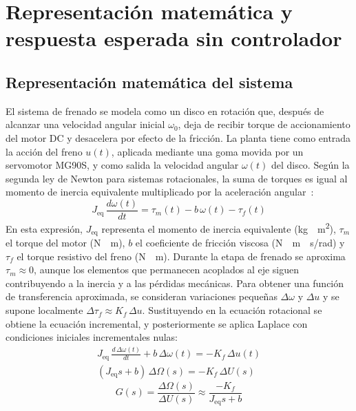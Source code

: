 \section{Representación matemática y respuesta esperada sin controlador}
\label{sec:p5}

\subsection{Representación matemática del sistema}
El sistema de frenado se modela como un disco en rotación que, después de alcanzar una velocidad
angular inicial $\omega_0$, deja de recibir torque de accionamiento del motor DC y desacelera por
efecto de la fricción. La planta tiene como entrada la acción del freno $u(t)$, aplicada mediante
una goma movida por un servomotor MG90S, y como salida la velocidad angular $\omega(t)$ del disco.
Según la segunda ley de Newton para sistemas rotacionales, la suma de torques es igual al momento
de inercia equivalente multiplicado por la aceleración angular~\cite{openstax_rotacion}:
\begin{equation}
  J_\text{eq}\,\frac{d\omega(t)}{dt} = \tau_m(t) - b\,\omega(t) - \tau_f(t)
  \label{eq:newton_rot}
\end{equation}
En esta expresión, $J_\text{eq}$ representa el momento de inercia equivalente
(\si{kg\cdot m^2}), $\tau_m$ el torque del motor (\si{N\cdot m}), $b$ el coeficiente de fricción
viscosa (\si{N\cdot m\cdot s/rad}) y $\tau_f$ el torque resistivo del freno (\si{N\cdot m}).
Durante la etapa de frenado se aproxima $\tau_m \approx 0$, aunque los elementos que permanecen
acoplados al eje siguen contribuyendo a la inercia y a las pérdidas mecánicas. Para obtener una
función de transferencia aproximada, se consideran variaciones pequeñas $\Delta\omega$ y
$\Delta u$ y se supone localmente $\Delta\tau_f \approx K_f\,\Delta u$. Sustituyendo en la
ecuación rotacional se obtiene la ecuación incremental, y posteriormente se aplica Laplace con
condiciones iniciales incrementales nulas:
\begin{gather*}
  J_\text{eq}\,\frac{d\,\Delta\omega(t)}{dt} + b\,\Delta\omega(t) = -K_f\,\Delta u(t) \\[4pt]
  (J_\text{eq}s + b)\,\Delta\Omega(s) = -K_f\,\Delta U(s)
\end{gather*}
\begin{equation}
  G(s) = \frac{\Delta\Omega(s)}{\Delta U(s)} \approx \frac{-K_f}{J_\text{eq}s + b}
  \label{eq:planta_G}
\end{equation}
